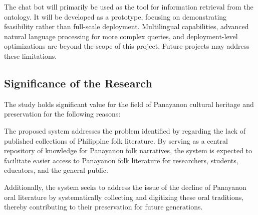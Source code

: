 The chat bot will primarily be used as the tool for information retrieval from the ontology.  It will be developed as a prototype, focusing on demonstrating feasibility rather than full-scale deployment. Multilingual capabilities, advanced natural language processing for more complex queries, and deployment-level optimizations are beyond the scope of this project. Future projects may address these limitations.

\subsection{Significance of the Research}
\label{sec:significance}
The study holds significant value for the field of Panayanon cultural heritage and preservation for the following reasons:

The proposed system addresses the problem identified by  regarding the lack of published collections of Philippine folk literature. By serving as a central repository of knowledge for Panayanon folk narratives, the system is expected to facilitate easier access to Panayanon folk literature for researchers, students, educators, and the general public.

Additionally, the system seeks to address the issue of the decline of Panayanon oral literature by systematically collecting and digitizing these oral traditions, thereby contributing to their preservation for future generations.